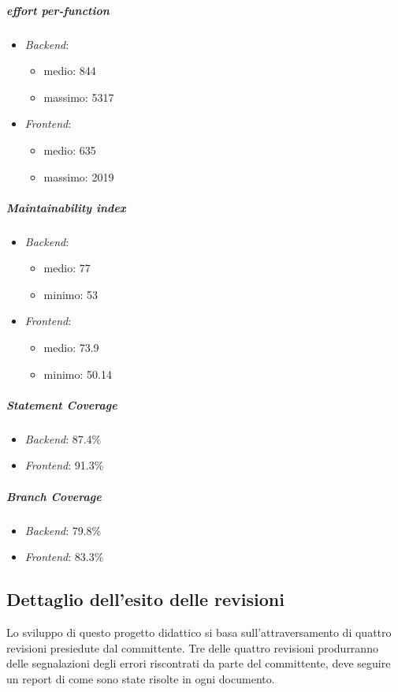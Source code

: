 	\subparagraph{ effort per-function}
	\begin{itemize}
		\item \emph{Backend}: 
		\begin{itemize}
			\item medio: 844
			\item massimo: 5317
		\end{itemize}
		\item \emph{Frontend}: 
		\begin{itemize}
			\item medio: 635
			\item massimo: 2019
		\end{itemize} 
	\end{itemize}


	\subparagraph{Maintainability index}
	\begin{itemize}
		\item \emph{Backend}: 
		\begin{itemize}
			\item medio: 77
			\item minimo: 53
		\end{itemize} 
		\item \emph{Frontend}: 
		\begin{itemize}
			\item medio: 73.9
			\item minimo: 50.14
		\end{itemize} 
	\end{itemize}


	\subparagraph{Statement Coverage}
	\begin{itemize}
		\item \emph{Backend}: 87.4\%
		\item \emph{Frontend}: 91.3\%
	\end{itemize}
	

	\subparagraph{Branch Coverage}
	\begin{itemize}
		\item \emph{Backend}: 79.8\%
		\item \emph{Frontend}: 83.3\%
	\end{itemize}

	


	\subsection{Dettaglio dell'esito delle revisioni}
	Lo sviluppo di questo progetto didattico si basa sull'attraversamento di quattro revisioni presiedute dal committente. Tre delle quattro revisioni produrranno delle segnalazioni degli errori riscontrati da parte del committente, deve seguire un report di come sono state risolte in ogni documento.
		
